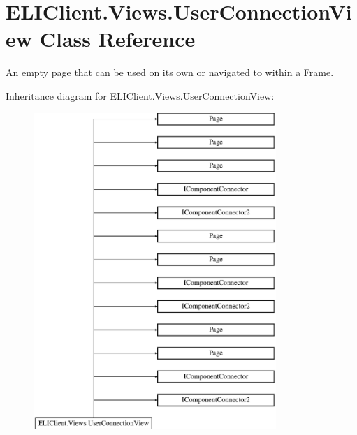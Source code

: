 \hypertarget{class_e_l_i_client_1_1_views_1_1_user_connection_view}{}\section{E\+L\+I\+Client.\+Views.\+User\+Connection\+View Class Reference}
\label{class_e_l_i_client_1_1_views_1_1_user_connection_view}


An empty page that can be used on its own or navigated to within a Frame.  


Inheritance diagram for E\+L\+I\+Client.\+Views.\+User\+Connection\+View\+:\begin{figure}[H]
\begin{center}
\leavevmode
\includegraphics[height=12.000000cm]{dd/dae/class_e_l_i_client_1_1_views_1_1_user_connection_view}
\end{center}
\end{figure}
